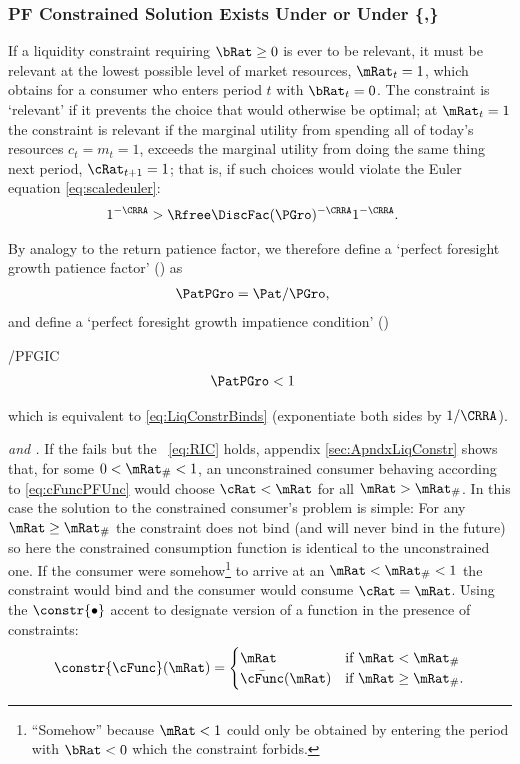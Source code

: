 \documentclass[BufferStockTheory]{subfiles}
\begin{document}
\subsubsection{PF Constrained Solution Exists Under {\RIC} or Under \{\cncl{\RIC},\PFGIC\}}\label{subsec:PFCon}


If a liquidity constraint requiring $\bRat \geq 0$ is ever to be relevant, it must be
relevant at the lowest possible level of market resources,
$\mRat_{t}=1$, which obtains for a consumer who enters period $t$ with
$\bRat_{t}=0$.  The constraint is `relevant' if
it prevents the choice that would otherwise be optimal; at
$\mRat_{t}=1$ the constraint is relevant if the marginal utility from spending all of today's
resources $c_{t}=m_{t}=1$, exceeds the marginal utility from
doing the same thing next period, $\cRat_{t+1}=1$; that is, if such
choices would violate the Euler equation \eqref{eq:scaledeuler}:
\begin{align}
  1^{-\CRRA}  & > \Rfree \DiscFac (\PGro)^{-\CRRA}1^{-\CRRA}  \label{eq:LiqConstrBinds}.
\end{align}

\hypertarget{PFGPF}{}
\hypertarget{PFGIC}{}
By analogy to the return patience factor, we therefore define a `perfect
foresight growth patience factor' (\PFGPF) as
\begin{align}
  \PatPGro  & = {\Pat}/\PGro,  \label{eq:PFGPF}
\end{align}
and define a `perfect foresight growth impatience condition' (\PFGIC)
\begin{verbatimwrite}{\EqDir/PFGIC}
\begin{align}
  \PatPGro &  < 1   \label{eq:PFGIC}
\end{align}
\end{verbatimwrite}

which is equivalent to \eqref{eq:LiqConstrBinds} (exponentiate both
sides by $1/\CRRA$).

\textit{\cncl{\PFGIC} and {\RIC}.}  If the {\PFGIC} fails but the \RIC~\eqref{eq:RIC} holds, appendix \ref{sec:ApndxLiqConstr} shows that, for some $0 < \mRat_{\#} < 1$, an unconstrained consumer behaving according to
\eqref{eq:cFuncPFUnc} would choose $\cRat < \mRat$ for all $\mRat >
\mRat_{\#}$.  In this case the solution to the constrained consumer's problem is simple: For any $\mRat
\geq \mRat_{\#}$ the constraint does not bind (and will never bind in
the future) so here the constrained consumption function is identical
to the unconstrained one.  If the consumer were somehow\footnote{``Somehow'' because $\mRat<1$ could only be
  obtained by entering the period with $\bRat < 0$ which the constraint
  forbids.}
to arrive at an $\mRat < \mRat_{\#} < 1$ the constraint would bind and
the consumer would consume $\cRat=\mRat$.  Using the $\constr{\bullet}$ accent to designate version of a function
in the presence of constraints:
\begin{equation}
  \constr{\cFunc}(\mRat)=
  \begin{cases}
    \mRat & \text{if $\mRat < \mRat_{\#}$} \\
    \bar{\cFunc}(\mRat)  & \text{if $\mRat \geq \mRat_{\#}$.}
  \end{cases}
\end{equation}
\end{document}
